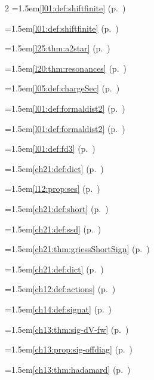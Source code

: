 \begin{multicols}{2}
\hangindent=1.5em\quad \ref{l01:def:shiftfinite} (p.~\pageref{l01:def:shiftfinite})\par
\hangindent=1.5em\quad \ref{l01:def:shiftfinite} (p.~\pageref{l01:def:shiftfinite})\par
\hangindent=1.5em\quad \ref{l25:thm:a2star} (p.~\pageref{l25:thm:a2star})\par
\hangindent=1.5em\quad \ref{l20:thm:resonances} (p.~\pageref{l20:thm:resonances})\par
\hangindent=1.5em\quad \ref{l05:def:chargeSec} (p.~\pageref{l05:def:chargeSec})\par
\hangindent=1.5em\quad \ref{l01:def:formaldist2} (p.~\pageref{l01:def:formaldist2})\par
\hangindent=1.5em\quad \ref{l01:def:formaldist2} (p.~\pageref{l01:def:formaldist2})\par
\hangindent=1.5em\quad \ref{l01:def:fd3} (p.~\pageref{l01:def:fd3})\par
\hangindent=1.5em\quad \ref{ch21:def:dict} (p.~\pageref{ch21:def:dict})\par
\hangindent=1.5em\quad \ref{l12:prop:ses} (p.~\pageref{l12:prop:ses})\par
\hangindent=1.5em\quad \ref{ch21:def:short} (p.~\pageref{ch21:def:short})\par
\hangindent=1.5em\quad \ref{ch21:def:ssd} (p.~\pageref{ch21:def:ssd})\par
\hangindent=1.5em\quad \ref{ch21:thm:griessShortSign} (p.~\pageref{ch21:thm:griessShortSign})\par
\hangindent=1.5em\quad \ref{ch21:def:dict} (p.~\pageref{ch21:def:dict})\par
\hangindent=1.5em\quad \ref{ch12:def:actions} (p.~\pageref{ch12:def:actions})\par
\hangindent=1.5em\quad \ref{ch14:def:signat} (p.~\pageref{ch14:def:signat})\par
\hangindent=1.5em\quad \ref{ch13:thm:sig-dV-fw} (p.~\pageref{ch13:thm:sig-dV-fw})\par
\hangindent=1.5em\quad \ref{ch13:prop:sig-offdiag} (p.~\pageref{ch13:prop:sig-offdiag})\par
\hangindent=1.5em\quad \ref{ch13:thm:hadamard} (p.~\pageref{ch13:thm:hadamard})\par

\end{multicols}
